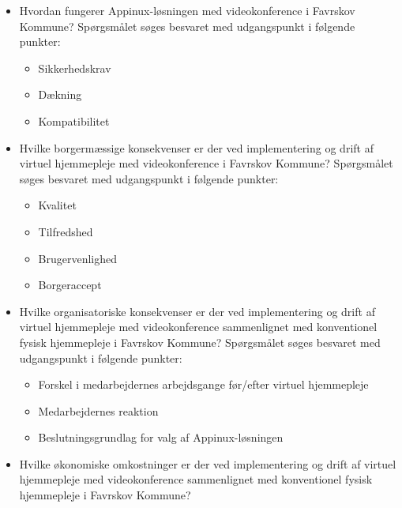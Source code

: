 \begin{itemize}
	\item Hvordan fungerer Appinux-løsningen med videokonference i Favrskov Kommune? Spørgsmålet søges besvaret med udgangspunkt i følgende punkter:
	\begin{itemize}
	\item Sikkerhedskrav
	\item Dækning %
	\item Kompatibilitet 
\end{itemize}
\end{itemize}

\begin{itemize}
	\item Hvilke borgermæssige konsekvenser er der ved implementering og drift af virtuel hjemmepleje med videokonference i Favrskov Kommune? Spørgsmålet søges besvaret med udgangspunkt i følgende punkter:
	\begin{itemize}
	\item Kvalitet 
	\item Tilfredshed
	\item Brugervenlighed
	\item Borgeraccept
\end{itemize}
\end{itemize}

\begin{itemize}
	\item Hvilke organisatoriske konsekvenser er der ved implementering og drift af virtuel hjemmepleje med videokonference sammenlignet med konventionel fysisk hjemmepleje i Favrskov Kommune? Spørgsmålet søges besvaret med udgangspunkt i følgende punkter:
	\begin{itemize}
	\item Forskel i medarbejdernes arbejdsgange før/efter virtuel hjemmepleje
	\item Medarbejdernes reaktion
	\item Beslutningsgrundlag for valg af Appinux-løsningen 
\end{itemize}
\end{itemize}


\begin{itemize}
	\item Hvilke økonomiske omkostninger er der ved implementering og drift af virtuel hjemmepleje med videokonference sammenlignet med konventionel fysisk hjemmepleje i Favrskov Kommune?
\end{itemize}

